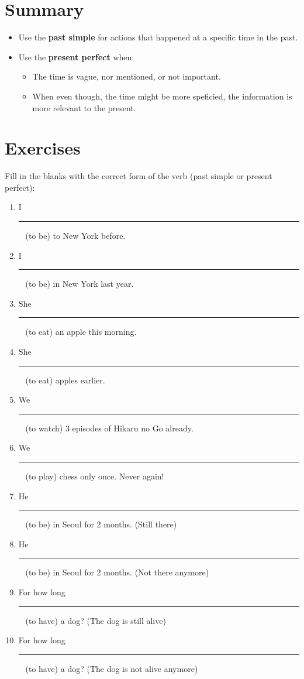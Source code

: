 \documentclass[12pt]{article}
\newcommand\customBlank{%
  \rule{2cm}{0.15mm} \ %
}
\begin{document}
\section{Summary}

\begin{itemize}
  \item Use the \textbf{past simple} for actions that happened at a specific time in the past.
  \item Use the \textbf{present perfect} when:
    \begin{itemize}
      \item The time is vague, nor mentioned, or not important.
      \item When even though, the time might be more speficied, the information is more relevant to the present.
    \end{itemize}
\end{itemize}

\section{Exercises}

Fill in the blanks with the correct form of the verb (past simple or present perfect):

\begin{enumerate}
  \item I \customBlank (to be) to New York before.
  \item I \customBlank (to be) in New York last year.
  \item She \customBlank (to eat) an apple this morning.
  \item She \customBlank (to eat) apples earlier.
  \item We \customBlank (to watch) 3 episodes of Hikaru no Go already.
  \item We \customBlank (to play) chess only once. Never again!
  \item He \customBlank (to be) in Seoul for 2 months. (Still there)
  \item He \customBlank (to be) in Seoul for 2 months. (Not there anymore)
  \item For how long \customBlank (to have) a dog? (The dog is still alive)
  \item For how long \customBlank (to have) a dog? (The dog is not alive anymore)
\end{enumerate}
\end{document}
